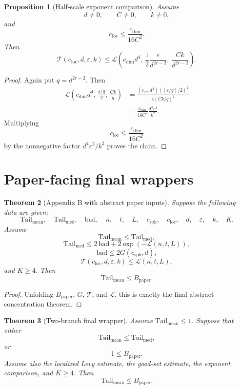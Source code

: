\documentclass[11pt]{article}
\newtheorem{theorem}{Theorem}[section]
\newtheorem{proposition}[theorem]{Proposition}
\begin{document}
\begin{proposition}[Half-scale exponent comparison]
Assume
\[
  d\ne0,\qquad C\ne0,\qquad k\ne0,
\]
and
\[
  c_{\mathrm{loc}}\le \frac{c_{\mathrm{dim}}}{16C^2}.
\]
Then
\[
 \mathcal T(c_{\mathrm{loc}},d,\varepsilon,k)
 \le
 \mathcal L\!\left(
     c_{\mathrm{dim}}d^4,\,
     \frac{1}{2}\frac{\varepsilon}{d^{2r-2}},\,
     \frac{Ck}{d^{2r-2}}
   \right).
\]
\end{proposition}

\begin{proof}
Again put \(q=d^{2r-2}\).  Then
\[
\begin{aligned}
 \mathcal L\!\left(
     c_{\mathrm{dim}}d^4,\,
     \frac{\varepsilon/q}{2},\,
     \frac{Ck}{q}
   \right)
 &=
 \frac{(c_{\mathrm{dim}}d^4)((\varepsilon/q)/2)^2}
      {4(Ck/q)^2} \\
 &=
 \frac{c_{\mathrm{dim}}}{16C^2}
 \frac{d^4\varepsilon^2}{k^2}.
\end{aligned}
\]
Multiplying
\[
 c_{\mathrm{loc}}\le \frac{c_{\mathrm{dim}}}{16C^2}
\]
by the nonnegative factor \(d^4\varepsilon^2/k^2\) proves the claim.
\end{proof}

\section{Paper-facing final wrappers}

\begin{theorem}[Appendix B with abstract paper inputs]
Suppose the following data are given:
\[
 \mathrm{Tail}_{\mathrm{mean}},\quad
 \mathrm{Tail}_{\mathrm{med}},\quad
 \mathrm{bad},\quad
 n,\quad t,\quad L,\quad
 c_{\mathrm{sph}},\quad c_{\mathrm{loc}},\quad d,\quad
 \varepsilon,\quad k,\quad K.
\]
Assume
\[
 \mathrm{Tail}_{\mathrm{mean}}\le \mathrm{Tail}_{\mathrm{med}},
\]
\[
 \mathrm{Tail}_{\mathrm{med}}
 \le
 2\,\mathrm{bad}
 +2\exp(-\mathcal L(n,t,L)),
\]
\[
 \mathrm{bad}\le 2G(c_{\mathrm{sph}},d),
\]
\[
 \mathcal T(c_{\mathrm{loc}},d,\varepsilon,k)\le \mathcal L(n,t,L),
\]
and \(K\ge4\).  Then
\[
 \mathrm{Tail}_{\mathrm{mean}}
 \le
 B_{\mathrm{paper}}.
\]
\end{theorem}

\begin{proof}
Unfolding \(B_{\mathrm{paper}}\), \(G\), \(\mathcal T\), and \(\mathcal L\),
this is exactly the final abstract concentration theorem.
\end{proof}

\begin{theorem}[Two-branch final wrapper]
Assume \(\mathrm{Tail}_{\mathrm{mean}}\le1\).  Suppose that either
\[
 \mathrm{Tail}_{\mathrm{mean}}\le \mathrm{Tail}_{\mathrm{med}},
\]
or
\[
 1\le B_{\mathrm{paper}}.
\]
Assume also the localized Levy estimate, the good-set estimate, the exponent
comparison, and \(K\ge4\).  Then
\[
  \mathrm{Tail}_{\mathrm{mean}}\le B_{\mathrm{paper}}.
\]
\end{theorem}
\end{document}
